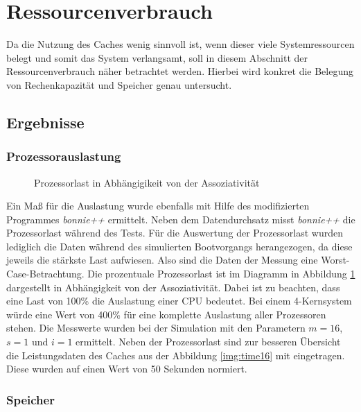 \section{Ressourcenverbrauch}
\label{chap7:mem}

Da die Nutzung des Caches wenig sinnvoll ist, wenn dieser viele Systemressourcen belegt und somit das System verlangsamt, soll in diesem Abschnitt der
Ressourcenverbrauch näher betrachtet werden. Hierbei wird konkret die Belegung von Rechenkapazität und Speicher genau untersucht.

\subsection{Ergebnisse}

\subsubsection{Prozessorauslastung}

\begin{figure}[b!]\centering
    \caption{Prozessorlast in Abhängigikeit von der Assoziativität}
    \label{img:cpu}
\end{figure}

Ein Maß für die Auslastung wurde ebenfalls mit Hilfe des modifizierten Programmes \textit{\mbox{bonnie++}} ermittelt. Neben dem Datendurchsatz misst
\textit{\mbox{bonnie++}} die Prozessorlast während des Tests. Für die Auswertung der Prozessorlast wurden lediglich die Daten während des simulierten Bootvorgangs
herangezogen, da diese jeweils die stärkste Last aufwiesen. Also sind die Daten der Messung eine Worst-Case-Betrachtung. Die prozentuale Prozessorlast ist im
Diagramm in Abbildung \ref{img:cpu} dargestellt in Abhängigkeit von der Assoziativität. Dabei ist zu beachten, dass eine Last von 100\% die Auslastung einer
CPU bedeutet. Bei einem 4-Kernsystem würde eine Wert von 400\% für eine komplette Auslastung aller Prozessoren stehen. Die Messwerte wurden bei der Simulation mit
den Parametern $m=16$, $s=1$ und $i=1$ ermittelt. Neben der Prozessorlast sind zur besseren Übersicht die Leistungsdaten des Caches aus der Abbildung
\ref{img:time16} mit eingetragen. Diese wurden auf einen Wert von 50 Sekunden normiert.

\subsubsection{Speicher}

